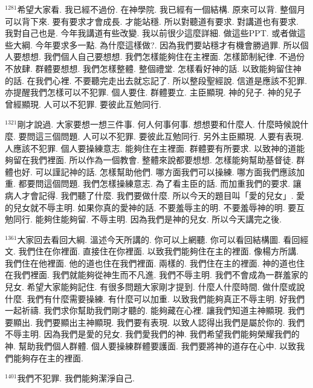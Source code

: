 \documentclass{book}
\begin{document}
$^{1281}$希望大家看.
我已經不過份.
在神學院.
我已經有一個結構.
原來可以背.
整個月可以背下來.
要有要求才會成長.
才能站穩.
所以對聽道有要求.
對講道也有要求.
我對自己也是.
今年我講道有些改變.
我以前很少這麼詳細.
做這些PPT.
或者做這些大綱.
今年要求多一點.
為什麼這樣做?.
因為我們要站穩才有機會勝過罪.
所以個人要想想.
我們個人自己要想想.
我們怎樣能夠住在主裡面.
怎樣節制紀律.
不過份不放肆.
群體要想想.
我們怎樣整體.
整個禮堂.
怎樣看好神的話.
以致能夠留住神的話.
在我們心裡.
不要聽完走出去就忘記了.
所以整段聖經說.
信道是應該不犯罪.
亦提醒我們怎樣可以不犯罪.
個人要住.
群體要立.
主臣顯現.
神的兒子.
神的兒子曾經顯現.
人可以不犯罪.
要彼此互勉同行.

$^{1321}$剛才說過.
大家要想一想三件事.
何人何事何事.
想想要和什麼人.
什麼時候說什麼.
要問這三個問題.
人可以不犯罪.
要彼此互勉同行.
另外主臣顯現.
人要有表現.
人應該不犯罪.
個人要操練意志.
能夠住在主裡面.
群體要有所要求.
以致神的道能夠留在我們裡面.
所以作為一個教會.
整體來說都要想想.
怎樣能夠幫助基督徒.
群體也好.
可以謹記神的話.
怎樣幫助他們.
哪方面我們可以操練.
哪方面我們應該加重.
都要問這個問題.
我們怎樣操練意志.
為了看主臣的話.
而加重我們的要求.
讓病人才會記得.
我們聽了什麼.
我們要做什麼.
所以今天的題目叫「愛的兒女」.
愛的兒女就不辱主明.
如果你真的愛神的話.
不要羞辱主的明.
不要羞辱神的明.
要互勉同行.
能夠住能夠留.
不辱主明.
因為我們是神的兒女.
所以今天講完之後.

$^{1361}$大家回去看回大綱.
溫述今天所講的.
你可以上網聽.
你可以看回結構圖.
看回經文.
我們住在你裡面.
直接住在你裡面.
以致我們能夠住在主的裡面.
像楊方所講.
我們住在他裡面.
他的道也住在我們裡面.
兩樣的.
我們住在主的裡面.
神的道也住在我們裡面.
我們就能夠從神生而不凡進.
我們不辱主明.
我們不會成為一群羞家的兒女.
希望大家能夠記住.
有很多問題大家剛才提到.
什麼人什麼時間.
做什麼或說什麼.
我們有什麼需要操練.
有什麼可以加重.
以致我們能夠真正不辱主明.
好我們一起祈禱.
我們求你幫助我們剛才聽的.
能夠藏在心裡.
讓我們知道主神顯現.
我們要顯出.
我們要顯出主神顯現.
我們要有表現.
以致人認得出我們是屬於你的.
我們不辱主明.
因為我們是愛的兒女.
我們愛我們的神.
我們希望我們能夠榮耀我們的神.
幫助我們個人群體.
個人要操練群體要護面.
我們要將神的道存在心中.
以致我們能夠存在主的裡面.

$^{1401}$我們不犯罪.
我們能夠潔淨自己.
\newpage
\end{document}

